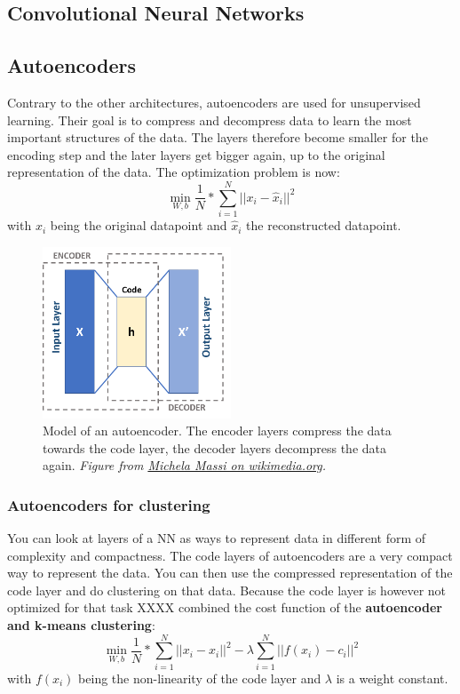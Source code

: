\documentclass[../main.tex]{subfiles}
\begin{document}
\subsection{Convolutional Neural Networks}

\subsection{Autoencoders}
Contrary to the other architectures, autoencoders are used for unsupervised learning. Their goal is to compress and decompress data to learn the most important structures of the data. The layers therefore become smaller for the encoding step and the later layers get bigger again, up to the original representation of the data. The optimization problem is now: 
\begin{equation}
    \min_{W,b} \frac{1}{N}*\sum_{i=1}^N ||x_i - \hat{x}_i||^2
\end{equation}
with $x_i$ being the original datapoint and $\hat{x}_i$ the reconstructed datapoint. 

\begin{figure}[h]
    \centering
    \includegraphics[width=0.5\textwidth]{../figures/Autoencoder_schema.png}
    \caption{Model of an autoencoder. The encoder layers compress the data towards the code layer, the decoder layers decompress the data again. \textit{Figure from \href{https://commons.wikimedia.org/wiki/File:Autoencoder_schema.png}{Michela Massi on wikimedia.org}.}}
    \label{CDF}
\end{figure}

\subsubsection{Autoencoders for clustering}
    You can look at layers of a NN as ways to represent data in different form of complexity and compactness. The code layers of autoencoders are a very compact way to represent the data. You can then use the compressed representation of the code layer and do clustering on that data. Because the code layer is however not optimized for that task XXXX combined the cost function of the \textbf{autoencoder and k-means clustering}: 
    \begin{equation}
        \min_{W,b} \frac{1}{N}*\sum_{i=1}^N ||x_i - \hat{x}_i||^2 - \lambda \sum_{i=1}^N ||f(x_i) - c_i||^2     
    \end{equation}
    with $f(x_i)$ being the non-linearity of the code layer and $\lambda$ is a weight constant. \\ %
\end{document}

